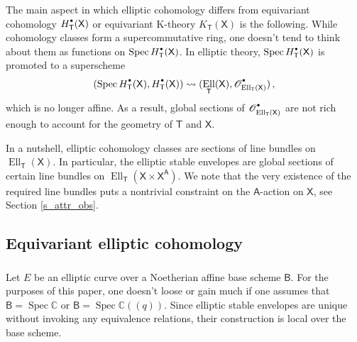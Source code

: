 \documentclass[14pt]{extarticle}
\newcommand{\cOd}{{\cO}^{\raisebox{0.5mm}{$\scriptscriptstyle \bullet$}}}
\newcommand{\C}{\mathbb{C}}
\newcommand{\bT}{\mathsf{T}}
\newcommand{\bA}{\mathsf{A}}
\newcommand{\bB}{\mathsf{B}}
\newcommand{\bX}{\mathsf{X}}
\newcommand{\cO}{\mathscr{O}}
\newcommand{\Hd}{{H}^{\raisebox{0.5mm}{$\scriptscriptstyle \bullet$}}}
\DeclareMathOperator{\Ell}{Ell}
\DeclareMathOperator{\Spec}{Spec}
\theoremstyle{definition}
\begin{document}
\subsubsection{} 

The main aspect in which elliptic cohomology differs from equivariant
cohomology $\Hd_\bT(\bX)$
or equivariant
K-theory $K_\bT(\bX)$ is the
following. While cohomology classes  form a
supercommutative ring,
one doesn't tend to think about them as functions on $\Spec
\Hd_\bT(\bX)$. In elliptic theory, 
$ \Spec \Hd_\bT(\bX)$ is promoted to a superscheme 
$$
( \Spec \Hd_\bT(\bX), \Hd_\bT(\bX)) \rightsquigarrow (\Ell_\bT(\bX),
\cOd_{\Ell_\bT(\bX)})\,,
$$
which is no longer affine. As a result, global sections 
of $\cOd_{\Ell_\bT(\bX)}$ are not rich enough to account for the geometry
of $\bT$ and $\bX$. 

In a nutshell, 
elliptic cohomology classes are sections of 
line bundles on $\Ell_\bT(\bX)$. In particular, the elliptic
stable envelopes are global sections of certain line bundles on $\Ell_\bT(\bX \times
\bX^\bA)$. We note that the very existence of the required line bundles
puts a nontrivial constraint on the $\bA$-action on $\bX$, see Section
\ref{s_attr_obs}. 








\subsection{Equivariant elliptic cohomology}

\subsubsection{} 

Let $E$ be an elliptic curve over a Noetherian affine base scheme
$\bB$.
For the purposes of this
paper, one doesn't loose or gain much if one assumes that
$\bB=\Spec \C$ or $\bB=\Spec \C(\!(q)\!)$. Since elliptic stable envelopes are
unique without invoking any equivalence relations, their construction
is local over the base scheme.  
\end{document}
